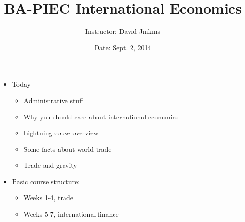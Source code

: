 \documentclass[ignorenonframetext,]{beamer}
\title{BA-PIEC International Economics}
\author{Instructor: David Jinkins}
\date{Date: Sept. 2, 2014}
\begin{document}
\frame{\titlepage}

\begin{frame}

\begin{itemize}
\itemsep1pt\parskip0pt
\item
  Today

  \begin{itemize}
  \itemsep1pt\parskip0pt
  \item
        Administrative stuff
  \item
        Why you should care about international economics
  \item
        Lightning couse overview
  \item
        Some facts about world trade
  \item
        Trade and gravity
  \end{itemize}
\end{itemize}

\end{frame}

\begin{frame}

\begin{itemize}
\itemsep1pt\parskip0pt
\item
  Basic course structure:

  \begin{itemize}
  \itemsep1pt\parskip0pt
  \item
    Weeks 1-4, trade
  \item
    Weeks 5-7, international finance
  \end{itemize}
\end{itemize}

\end{frame}
\end{document}
